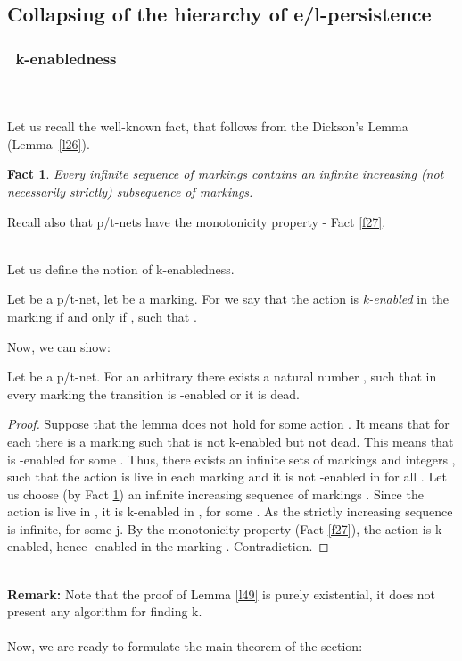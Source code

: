 \documentclass[a4paper]{llncs}
\newtheorem{fact}{Fact}
\begin{document}
\subsection{Collapsing of the hierarchy of e/l-persistence}


\subsubsection{\textbullet \ k-enabledness}\mbox{ }\\
\\
Let us recall the well-known fact, that follows from the Dickson's Lemma (Lemma~\ref{l26}).

\begin{fact}
\label{f47}
Every infinite sequence of markings contains an infinite increasing (not necessarily strictly) subsequence of markings.
\end{fact}
Recall also that p/t-nets have the monotonicity property - Fact \ref{f27}.

\mbox{ }\\
Let us define the notion of k-enabledness.
\begin{definition}[k-enabledness]
\label{d48}
Let  be a p/t-net, let  be a marking. For  we say that the action  is \emph{k-enabled} in the marking  if and only if , such that .
\end{definition}
\newpage
Now, we can show:

\begin{lemma}
\label{l49}
Let  be a p/t-net. For an arbitrary  there exists a natural number , such that in every marking  the transition  is -enabled or it is dead.
\end{lemma}
\begin{proof}
Suppose that the lemma does not hold for some action . It means that for each  there is a marking  such that  is not k-enabled but not dead. This means that  is -enabled for some . Thus, there exists  an infinite sets of markings  and integers , such that the action  is live in each marking  and it is not -enabled in  for all .
Let us choose (by Fact \ref{f47}) an infinite increasing sequence of markings .
Since the action  is live in , it is k-enabled in , for some . As the strictly increasing sequence  is infinite,  for some j. By the monotonicity property (Fact \ref{f27}), the action  is k-enabled, hence  -enabled in the marking . Contradiction.	
\end{proof}
\mbox{ }\\
\textbf{Remark:} Note that the proof of Lemma \ref{l49} is purely existential, it does not present any algorithm for finding k.
\\
\\
Now, we are ready to formulate the main theorem of the section:
\end{document}
